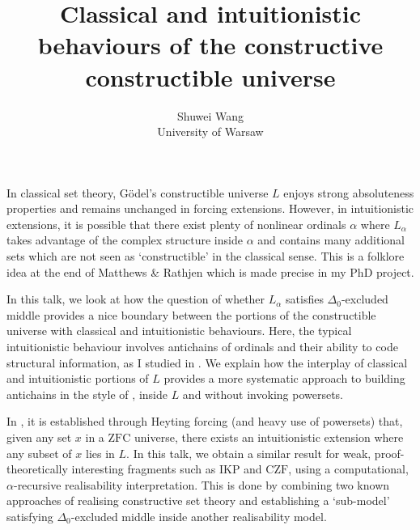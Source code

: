 \documentclass[11pt]{article}
\title{Classical and intuitionistic behaviours of the constructive constructible universe}
\author{Shuwei Wang \\[2pt] \small University of Warsaw}
\date{\DTMdate{2026-11-18}}
\begin{document}
\maketitle

In classical set theory, G\"odel's constructible universe $L$ enjoys strong absoluteness properties and remains unchanged in forcing extensions. However, in intuitionistic extensions, it is possible that there exist plenty of nonlinear ordinals $\alpha$ where $L_\alpha$ takes advantage of the complex structure inside $\alpha$ and contains many additional sets which are not seen as `constructible' in the classical sense. This is a folklore idea at the end of Matthews \& Rathjen \cite{matthews-rathjen24-constructible-universe} which is made precise in my PhD project.

In this talk, we look at how the question of whether $L_\alpha$ satisfies $\Delta_0$-excluded middle provides a nice boundary between the portions of the constructible universe with classical and intuitionistic behaviours. Here, the typical intuitionistic behaviour involves antichains of ordinals and their ability to code structural information, as I studied in \cite{wang-sw26-antichain}. We explain how the interplay of classical and intuitionistic portions of $L$ provides a more systematic approach to building antichains in the style of \cite{wang-sw26-antichain}, inside $L$ and without invoking powersets.

In \cite{wang-sw26-plump}, it is established through Heyting forcing (and heavy use of powersets) that, given any set $x$ in a $\mathrm{ZFC}$ universe, there exists an intuitionistic extension where any subset of $x$ lies in $L$. In this talk, we obtain a similar result for weak, proof-theoretically interesting fragments such as $\mathrm{IKP}$ and $\mathrm{CZF}$, using a computational, $\alpha$-recursive realisability interpretation. This is done by combining two known approaches of realising constructive set theory and establishing a `sub-model' satisfying $\Delta_0$-excluded middle inside another realisability model.

\begin{bibdiv}
  \begin{biblist}




  \end{biblist}
\end{bibdiv}
\end{document}
